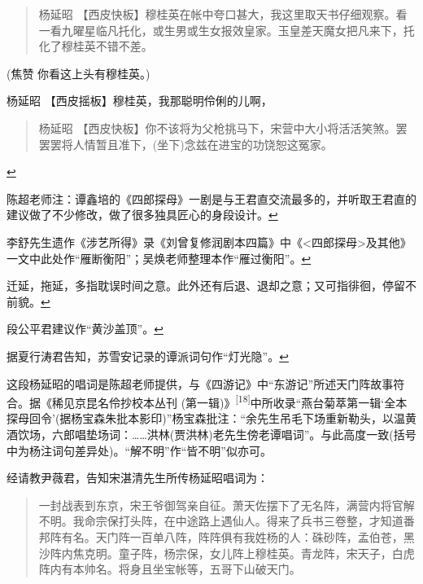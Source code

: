   \begin{quote}
  杨延昭
  【西皮快板】穆桂英在帐中夸口甚大，我这里取天书仔细观察。看一看九曜星临凡托化，或生男或生女报效皇家。玉皇差天魔女把凡来下，托化了穆桂英不错不差。
  \end{quote}

  (焦赞 你看这上头有穆桂英。)

  杨延昭 【西皮摇板】穆桂英，我那聪明伶俐的儿啊，

  \begin{quote}
  杨延昭
  【西皮快板】你不该将为父枪挑马下，宋营中大小将活活笑煞。罢罢罢将人情暂且准下，(坐下)念兹在进宝的功饶恕这冤家。
  \end{quote}

  \protect\hyperlink{fnref463}{↩}
\item
  \leavevmode\hypertarget{fn464}{}%
  陈超老师注：谭鑫培的《四郎探母》一剧是与王君直交流最多的，并听取王君直的建议做了不少修改，做了很多独具匠心的身段设计。\protect\hyperlink{fnref464}{↩}
\item
  \leavevmode\hypertarget{fn465}{}%
  李舒先生遗作《涉艺所得》录《刘曾复修润剧本四篇》中《\textless{}四郎探母\textgreater{}及其他》一文中此处作``雁断衡阳''；吴焕老师整理本作``雁过衡阳''。\protect\hyperlink{fnref465}{↩}
\item
  \leavevmode\hypertarget{fn466}{}%
  迁延，拖延，多指耽误时间之意。此外还有后退、退却之意；又可指徘徊，停留不前貌。\protect\hyperlink{fnref466}{↩}
\item
  \leavevmode\hypertarget{fn467}{}%
  段公平君建议作``黄沙盖顶''。\protect\hyperlink{fnref467}{↩}
\item
  \leavevmode\hypertarget{fn468}{}%
  据夏行涛君告知，苏雪安记录的谭派词句作``灯光隐''。\protect\hyperlink{fnref468}{↩}
\item
  \leavevmode\hypertarget{fn469}{}%
  这段杨延昭的唱词是陈超老师提供，与《四游记》中``东游记''所述天门阵故事符合。据《稀见京昆名伶抄校本丛刊
  (第一辑)》\textsuperscript{{[}18{]}}中所收录``燕台菊萃第一辑`全本探母回令'(据杨宝森朱批本影印)''杨宝森批注：``余先生吊毛下场重新勒头，以温黄酒饮场，六郎唱垫场词：\ldots{}\ldots{}洪林(贾洪林)老先生傍老谭唱词''。与此高度一致(括号中为杨注词句差异处)。``解不明''作``皆不明''似亦可。

  经请教尹薇君，告知宋湛清先生所传杨延昭唱词为：

  \begin{quote}
  一封战表到东京，宋王爷御驾亲自征。萧天佐摆下了无名阵，满营内将官解不明。我命宗保打头阵，在中途路上遇仙人。得来了兵书三卷整，才知道番邦阵有名。天门阵一百单八阵，阵阵俱有我姓杨的人：硃砂阵，孟伯苍，黑沙阵内焦克明。童子阵，杨宗保，女儿阵上穆桂英。青龙阵，宋天子，白虎阵内有本帅名。将身且坐宝帐等，五哥下山破天门。
  \end{quote}

